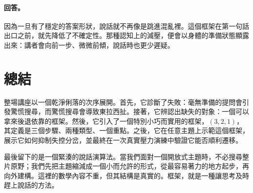 \paragraph{回答。} 因為一旦有了穩定的答案形狀，說話就不再像是跳進混亂裡。這個框架在第一句話出口之前，就先降低了不確定性。那種認知上的減壓，便會以身體的準備狀態顯露出來：講者會向前一步、微微前傾，說話時也更少遲疑。

\section{總結}

整場講座以一個乾淨俐落的次序展開。首先，它診斷了失敗：毫無準備的提問會引發驚慌搜尋，而驚慌搜尋會導致東拉西扯。接著，它辨認出缺失的對象：一個可以拿來後退依靠的框架。然後，它引入了一個特別小巧而實用的框架，\((3,2,1)\)，其定義是三個步驟、兩種類型、一個重點。之後，它在任意主題上示範這個框架，展示它如何抑制失控分岔，並最終在一次真實壓力演練中驗證它能否順利遷移。

最後留下的是一個緊湊的說話演算法。當我們面對一個開放式主題時，不必搜尋整片原野；我們先把主題縮減成一個小而允許的形式，從最容易著力的地方起步，再向外建構。這裡的數學內容不重，但其結構是真實的。框架，就是一種讓思考及時趕上說話的方法。